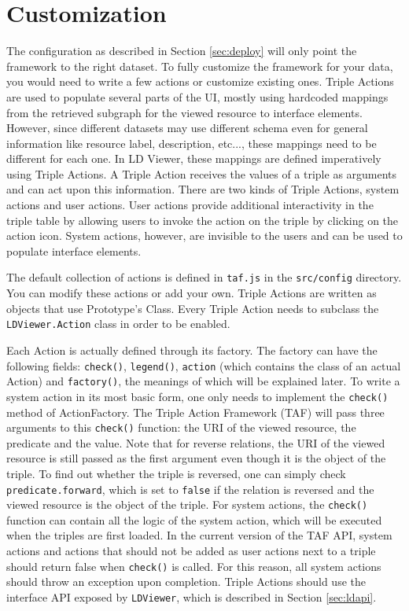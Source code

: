 \documentclass{book}
\begin{document}
\section{Customization}
\label{sec:makeactions}
The configuration as described in Section \ref{sec:deploy} will only point the framework to the right dataset.
To fully customize the framework for your data, you would need to write a few actions or customize existing ones.
Triple Actions are used to populate several parts of the UI, mostly using hardcoded mappings from the retrieved subgraph for the viewed resource to interface elements.
However, since different datasets may use different schema even for general information like resource label, description, etc..., these mappings need to be different for each one.
In LD Viewer, these mappings are defined imperatively using Triple Actions.
A Triple Action receives the values of a triple as arguments and can act upon this information.
There are two kinds of Triple Actions, system actions and user actions.
User actions provide additional interactivity in the triple table by allowing users to invoke the action on the triple by clicking on the action icon.
System actions, however, are invisible to the users and can be used to populate interface elements.

The default collection of actions is defined in \texttt{taf.js} in the \texttt{src/config} directory.
You can modify these actions or add your own.
Triple Actions are written as objects that use Prototype's Class.
Every Triple Action needs to subclass the \texttt{LDViewer.Action} class in order to be enabled.

Each Action is actually defined through its factory.
The factory can have the following fields: \texttt{check()}, \texttt{legend()}, \texttt{action} (which contains the class of an actual Action) and \texttt{factory()}, the meanings of which will be explained later.
To write a system action in its most basic form, one only needs to implement the \texttt{check()} method of ActionFactory.
The Triple Action Framework (TAF) will pass three arguments to this \texttt{check()} function: the URI of the viewed resource, the predicate and the value.
Note that for reverse relations, the URI of the viewed resource is still passed as the first argument even though it is the object of the triple.
To find out whether the triple is reversed, one can simply check \texttt{predicate.forward}, which is set to \texttt{false} if the relation is reversed and the viewed resource is the object of the triple.
For system actions, the \texttt{check()} function can contain all the logic of the system action, which will be executed when the triples are first loaded.
In the current version of the TAF API, system actions and actions that should not be added as user actions next to a triple should return false when \texttt{check()} is called.
For this reason, all system actions should throw an exception upon completion.
Triple Actions should use the interface API exposed by \texttt{LDViewer}, which is described in Section \ref{sec:ldapi}.
\end{document}
